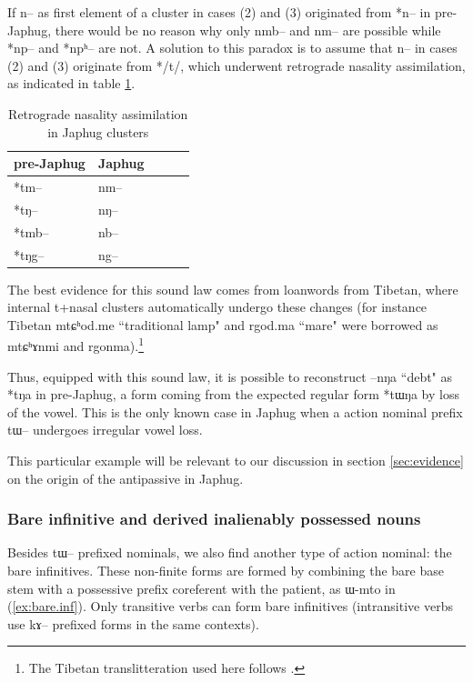 \documentclass[oldfontcommands,oneside,a4paper,11pt]{article}
\newcommand{\ipa}[1]{{\phon \mbox{#1}}} %
\begin{document}
If \ipa{n}-- as first element of a cluster in cases (2) and (3) originated from *n-- in pre-Japhug, there would be no reason why only \ipa{nmb--} and \ipa{nm--} are possible while *\ipa{np--} and *\ipa{npʰ--} are not. A solution to this paradox is to assume that \ipa{n--} in cases (2) and (3) originate from */t/, which underwent retrograde nasality assimilation, as indicated in table \ref{tab:assimilation}.

\begin{table}[H]
\caption{Retrograde nasality assimilation in Japhug clusters} \label{tab:assimilation} \centering
\begin{tabular}{lllll}
\toprule
pre-Japhug & Japhug \\
\midrule
\ipa{*tm}-- & \ipa{nm--} \\
\ipa{*tŋ}-- & \ipa{nŋ--} \\
\ipa{*tmb}-- & \ipa{nb--} \\
\ipa{*tŋg}-- & \ipa{ng--} \\
\bottomrule
\end{tabular}
\end{table}
The best evidence for  this sound law comes from loanwords from Tibetan, where internal t+nasal clusters automatically undergo these changes (for instance Tibetan \ipa{mtɕʰod.me} ``traditional lamp" and \ipa{rgod.ma} ``mare" were borrowed as \ipa{mtɕʰɤnmi} and \ipa{rgonma}).\footnote{The Tibetan translitteration used here follows \citet{jacques12transcription}. }

Thus, equipped with this sound law,  it is possible to reconstruct \ipa{--nŋa} ``debt" as *tŋa in pre-Japhug, a form coming from the expected regular form *tɯŋa by loss of the vowel. This is the only known case in Japhug when a action nominal prefix \ipa{tɯ}-- undergoes irregular vowel loss.




This particular example will be relevant to our discussion in section \ref{sec:evidence} on the origin of the antipassive in Japhug.

\subsubsection{Bare infinitive  and derived inalienably possessed nouns} \label{subsubsec:bare}
Besides \ipa{tɯ}-- prefixed nominals, we also find another type of action nominal: the bare  infinitives. These non-finite forms are formed by combining the bare base stem with a possessive prefix coreferent with the patient, as \ipa{ɯ-mto} in (\ref{ex:bare.inf}). Only transitive verbs can form bare infinitives (intransitive verbs use \ipa{kɤ}-- prefixed forms in the same contexts).
\end{document}
